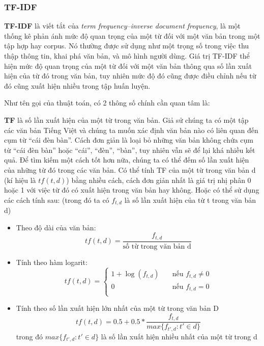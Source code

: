 \documentclass[12pt]{report}
\begin{document}
\subsubsection{TF-IDF}

\textbf{TF-IDF} là viết tắt của \textit{term frequency–inverse document frequency}, là một thống kê phản ánh mức độ quan trọng của một từ đối với một văn bản trong một tập hợp hay corpus. Nó thường được sử dụng như một trọng số trong việc thu thập thông tin, khai phá văn bản, và mô hình người dùng. Giá trị TF-IDF thể hiện mức độ quan trọng của một từ đối với một văn bản thông qua số lần xuất hiện của từ đó trong văn bản, tuy nhiên mức độ đó cũng được điều chỉnh nếu từ đó cũng xuất hiện nhiều trong tập huấn luyện.

Như tên gọi của thuật toán, có 2 thông số chính cần quan tâm là:

\textbf{TF} là số lần xuất hiện của một từ trong văn bản. Giả sử chúng ta có một tập các văn bản Tiếng Việt và chúng ta muốn xác định văn bản nào có liên quan đến cụm từ ``cái đèn bàn''. Cách đơn giản là loại bỏ những văn bản không chứa cụm từ ``cái đèn bàn'' hoặc ``cái'', ``đèn'', ``bàn'', tuy nhiên vẫn sẽ để lại khá nhiều kết quả. Để tìm kiếm một cách tốt hơn nữa, chúng ta có thể đếm số lần xuất hiện của những từ đó trong các văn bản. Có thể tính TF của một từ trong văn bản d (kí hiệu là $tf(t, d)$) bằng nhiều cách, cách đơn giản nhất là giá trị nhị phân 0 hoặc 1 với việc từ đó có xuất hiện trong văn bản hay không. Hoặc có thể sử dụng các cách tính sau: (trong đó ta có $f_{t, d}$ là số lần xuất hiện của từ t trong văn bản d)

\begin{itemize}
	\item Theo độ dài của văn bản:
	\[tf(t, d) = \frac{f_{t, d}}{\text{số từ trong văn bản d}}\]
	\item Tính theo hàm logarit:
	\[tf(t, d) = 
		\begin{cases}
		    1 + \log(f_{t, d})       & \quad \text{nếu } f_{t, d} \neq 0 \\
		    0  & \quad \text{nếu } f_{t, d} = 0\\
	  	\end{cases}
	\]
	\item Tính theo số lần xuất hiện lớn nhất của một từ trong văn bản D
	\[tf(t, d) = 0.5 + 0.5*\frac{f_{t, d}}{max\{f_{t', d}:t'\in d\}}\]
	trong đó $max\{f_{t', d}:t'\in d\}$ là số lần xuất hiện nhiều nhất của một từ trong d
\end{itemize}
\end{document}
